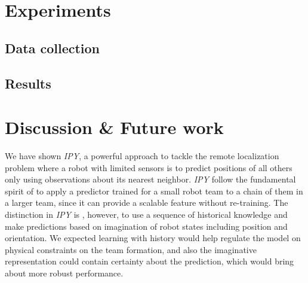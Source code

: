 \documentclass[letterpaper, 10 pt, conference]{ieeeconf}  %
\begin{document}
	\section{Experiments} 
	\label{sec:experiments} 
	
	\subsection{Data collection} 
	\label{sec:data_collection}
	
	\subsection{Results} 
	\label{sec:results}
	

	
		

	\section{Discussion \& Future work}
	\label{sec:discussion_and_future_work}
	
	We have shown \emph{IPY}, a powerful approach to tackle the remote localization problem 
	where a robot with limited sensors is to predict positions of all others only using 
	observations about its nearest neighbor. 
	\emph{IPY} follow the fundamental spirit of \cite{Choi17} to apply a predictor 
	trained for a small robot team to a chain of them in a larger team, since it 
	can provide a scalable feature without re-training.   
	The distinction in \emph{IPY} is , however, to use a sequence of historical knowledge and 
	make predictions based on imagination of robot states including position and orientation.
	We expected learning with history would help regulate the model on physical constraints on 
	the team formation, and also the imaginative representation could contain 
	certainty about the prediction, which would bring about more robust performance. 
	
\end{document}
